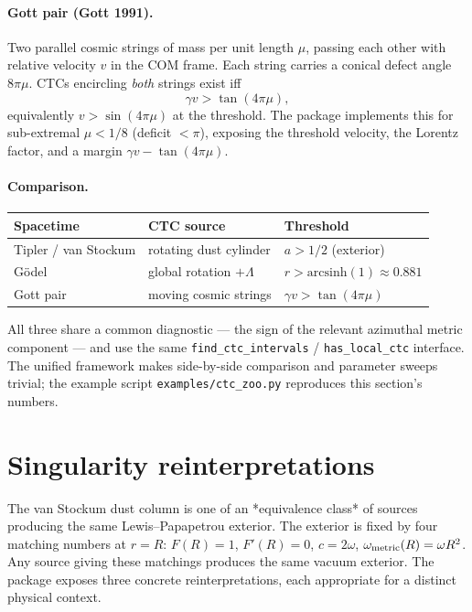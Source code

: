 \documentclass[11pt,a4paper]{article}
\begin{document}
\paragraph{Gott pair (Gott 1991).}
Two parallel cosmic strings of mass per unit length $\mu$, passing each
other with relative velocity $v$ in the COM frame. Each string carries
a conical defect angle $8\pi\mu$. CTCs encircling \emph{both}
strings exist iff
\begin{equation}
\gamma v > \tan(4\pi\mu),
\end{equation}
equivalently $v > \sin(4\pi\mu)$ at the threshold. The package
implements this for sub-extremal $\mu < 1/8$ (deficit $< \pi$),
exposing the threshold velocity, the Lorentz factor, and a margin
$\gamma v - \tan(4\pi\mu)$.

\paragraph{Comparison.}

\begin{center}
\begin{tabular}{lll}
\toprule
Spacetime & CTC source & Threshold \\
\midrule
Tipler / van Stockum & rotating dust cylinder & $a > 1/2$ (exterior) \\
G\"odel              & global rotation $+ \Lambda$ & $r > \mathrm{arcsinh}(1) \approx 0.881$ \\
Gott pair            & moving cosmic strings & $\gamma v > \tan(4\pi\mu)$ \\
\bottomrule
\end{tabular}
\end{center}

All three share a common diagnostic --- the sign of the relevant
azimuthal metric component --- and use the same
\texttt{find\_ctc\_intervals} / \texttt{has\_local\_ctc} interface.
The unified framework makes side-by-side comparison and parameter
sweeps trivial; the example script
\texttt{examples/ctc\_zoo.py} reproduces this section's numbers.

\section{Singularity reinterpretations}
\label{sec:singularities}

The van Stockum dust column is one of an *equivalence class* of sources
producing the same Lewis--Papapetrou exterior. The exterior is fixed
by four matching numbers at $r = R$: $F(R) = 1$, $F'(R) = 0$,
$c = 2\omega$, $\omega_{\rm metric}(R) = \omega R^2$. Any source
giving these matchings produces the same vacuum exterior. The package
exposes three concrete reinterpretations, each appropriate for a
distinct physical context.
\end{document}
